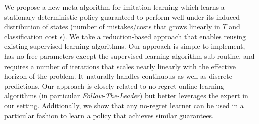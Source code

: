 \documentclass[twoside]{article}
\begin{document}

We propose a new meta-algorithm for imitation learning which learns a stationary deterministic policy guaranteed to perform well under its induced distribution of states (number of mistakes/costs that grows linearly in $T$ and classification cost $\epsilon$). We take a reduction-based approach \citep{Beygelzimer05} that enables reusing existing supervised learning algorithms.
Our approach is simple to implement, has no free parameters except the supervised learning algorithm sub-routine, and requires a
number of iterations that scales nearly linearly with the effective horizon of the problem. It naturally handles continuous as well as discrete
predictions. Our approach is closely related to no regret online learning algorithms \citep{CesaBianchi04, Hazan06, Kakade08} (in particular \emph{Follow-The-Leader}) but better leverages the expert in our setting. Additionally, we show that any no-regret learner can be used in a particular fashion to learn a policy that achieves similar guarantees.
\end{document}

